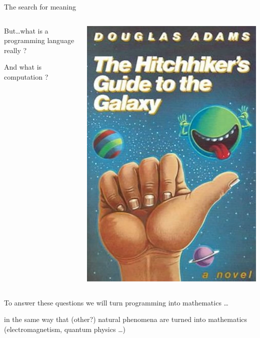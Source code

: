 \documentclass{beamer}
\begin{document}
\begin{frame}{ The search for meaning }

  \begin{minipage}[1\textheight]{\textwidth}

  \begin{columns}[c]
  \begin{column}{0.7\textwidth}

        But\dots  what is a programming language really ?

        And what is computation ? 

  \end{column}
  \begin{column}{0.2\textwidth}
    
        \includegraphics[scale=0.1]{images/hitchhiker.jpg}
  \end{column}
  \end{columns}
  \end{minipage}

  \vfill
  \pause
  To answer these questions we will turn programming into \alert{mathematics}
  \dots

  in the same way that (other?) natural phenomena are turned into mathematics
  (electromagnetism, quantum physics \dots)
\end{frame}
\end{document}
